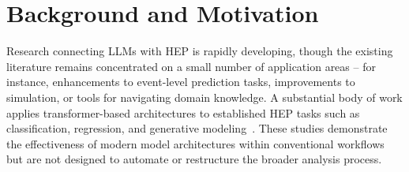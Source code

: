 \documentclass[aps,prd,reprint,superscriptaddress]{revtex4-2}
\begin{document}


\section{Background and Motivation}
Research connecting LLMs with HEP is rapidly developing, though the existing literature remains concentrated on a small number of application areas -- for instance, enhancements to event-level prediction tasks, improvements to simulation, or tools for navigating domain knowledge. A substantial body of work applies transformer-based architectures to established HEP tasks such as classification, regression, and generative modeling~\citep{Qu:2022mxj,Qiu:2022xvr,Huang:2024voo,Mikuni:2024qsr}. These studies demonstrate the effectiveness of modern model architectures within conventional workflows but are not designed to automate or restructure the broader analysis process.
\end{document}
